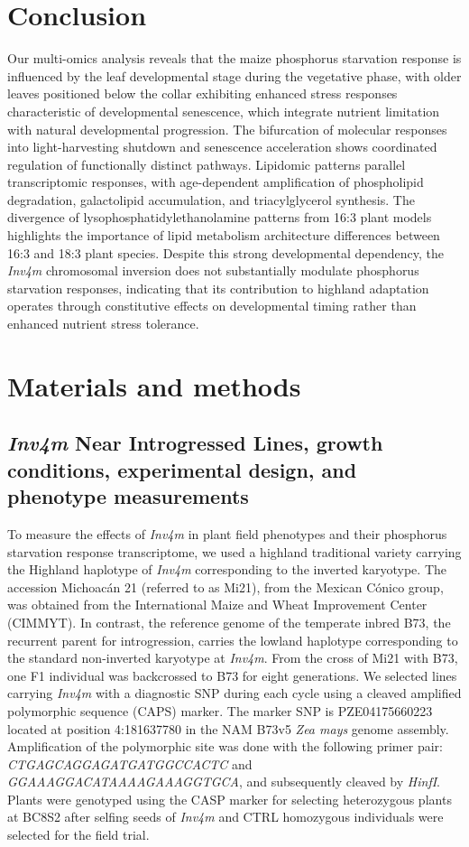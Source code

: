 \documentclass[9pt,twocolumn,twoside]{rilabRxiv}
\newcommand{\invfour}{\textit{Inv4m}\xspace}
\begin{document}
\section*{Conclusion}

Our multi-omics analysis reveals that the maize phosphorus starvation response is influenced by the leaf developmental stage during the vegetative phase, with older leaves positioned below the collar exhibiting enhanced stress responses characteristic of developmental senescence, which integrate nutrient limitation with natural developmental progression.
The bifurcation of molecular responses into light-harvesting shutdown and senescence acceleration shows coordinated regulation of functionally distinct pathways.
Lipidomic patterns parallel transcriptomic responses, with age-dependent amplification of phospholipid degradation, galactolipid accumulation, and triacylglycerol synthesis.
The divergence of lysophosphatidylethanolamine patterns from 16:3 plant models highlights the importance of lipid metabolism architecture differences between 16:3 and 18:3 plant species.
Despite this strong developmental dependency, the \invfour chromosomal inversion does not substantially modulate phosphorus starvation responses, indicating that its contribution to highland adaptation operates through constitutive effects on developmental timing rather than enhanced nutrient stress tolerance.


\section*{Materials and methods}

\subsection*{\invfour Near Introgressed Lines, growth conditions, experimental design, and phenotype measurements}

To measure the effects of \invfour in plant field phenotypes and their phosphorus starvation response transcriptome, we used a highland traditional variety carrying the Highland haplotype of \invfour corresponding to the inverted karyotype.
The accession Michoacán 21 (referred to as Mi21), from the Mexican Cónico group, was obtained from the International Maize and Wheat Improvement Center (CIMMYT). 
In contrast, the reference genome of the temperate inbred B73, the recurrent parent for introgression, carries the lowland haplotype corresponding to the standard non-inverted karyotype at \invfour.
From the cross of Mi21 with B73, one F1 individual was backcrossed to B73 for eight generations. We selected lines carrying  \invfour with a diagnostic SNP during each cycle using a cleaved amplified polymorphic sequence (CAPS) marker. 
The marker SNP is PZE04175660223 located at position 4:181637780 in the NAM B73v5 \textit{Zea mays} genome assembly.
Amplification of the polymorphic site was done with the following primer pair: \textit{CTGAGCAGGAGATGATGGCCACTC} and \textit{GGAAAGGACATAAAAGAAAGGTGCA}, and subsequently cleaved by \textit{HinfI}.
Plants were genotyped using the CASP marker for selecting heterozygous plants at BC8S2 after selfing seeds of \invfour and CTRL homozygous individuals were selected for the field trial.
\end{document}

